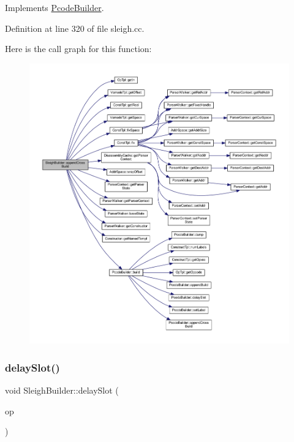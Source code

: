 Implements \mbox{\hyperlink{class_pcode_builder_ab8214b4b69aea45b459b1a37c1c2aa77}{Pcode\+Builder}}.



Definition at line 320 of file sleigh.\+cc.

Here is the call graph for this function\+:
\nopagebreak
\begin{figure}[H]
\begin{center}
\leavevmode
\includegraphics[width=350pt]{class_sleigh_builder_a343885f1c2044a04ae3587d121a968dd_cgraph}
\end{center}
\end{figure}
\mbox{\label{class_sleigh_builder_aa6cee1d2f18ab2d9e3ff24a41fe80770}} 
\subsubsection{\texorpdfstring{delaySlot()}{delaySlot()}}
{\footnotesize\ttfamily void Sleigh\+Builder\+::delay\+Slot (\begin{DoxyParamCaption}\item[{\mbox{\hyperlink{class_op_tpl}{Op\+Tpl}} $\ast$}]{op }\end{DoxyParamCaption})\hspace{0.3cm}{\ttfamily [virtual]}}



